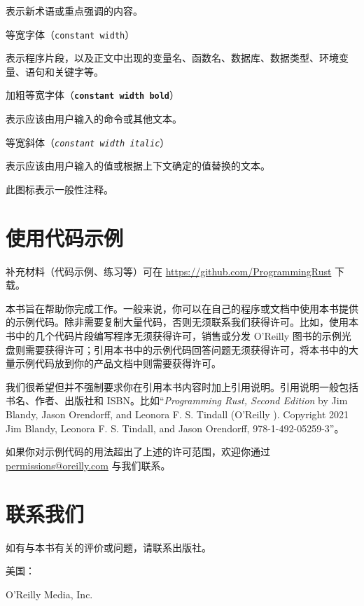 表示新术语或重点强调的内容。

等宽字体（\texttt{constant width}）

表示程序片段，以及正文中出现的变量名、函数名、数据库、数据类型、环境变量、语句和关键字等。

\begin{mySidenote}
加粗等宽字体（\textbf{\texttt{constant width bold}}）
\end{mySidenote}

表示应该由用户输入的命令或其他文本。

\begin{mySidenote}
等宽斜体（\emph{\texttt{constant width italic}}）
\end{mySidenote}

表示应该由用户输入的值或根据上下文确定的值替换的文本。

此图标表示一般性注释。

\section{使用代码示例}

补充材料（代码示例、练习等）可在 \href{https://github.com/ProgrammingRust}{https://github.com/\allowbreak{}ProgrammingRust} 下载。

本书旨在帮助你完成工作。一般来说，你可以在自己的程序或文档中使用本书提供的示例代码。除非需要复制大量代码，否则无须联系我们获得许可。比如，使用本书中的几个代码片段编写程序无须获得许可，销售或分发 O'Reilly 图书的示例光盘则需要获得许可；引用本书中的示例代码回答问题无须获得许可，将本书中的大量示例代码放到你的产品文档中则需要获得许可。

我们很希望但并不强制要求你在引用本书内容时加上引用说明。引用说明一般包括书名、作者、出版社和 ISBN。比如“\emph{Programming Rust, Second Edition} by Jim Blandy, Jason Orendorff, and Leonora F. S. Tindall (O'Reilly ). Copyright 2021 Jim Blandy, Leonora F. S. Tindall, and Jason Orendorff, 978-1-492-05259-3”。

如果你对示例代码的用法超出了上述的许可范围，欢迎你通过 \href{mailto:permissions@oreilly.com}{permissions@oreilly.com} 与我们联系。

\section{联系我们}

如有与本书有关的评价或问题，请联系出版社。

美国：

O'Reilly Media, Inc.

